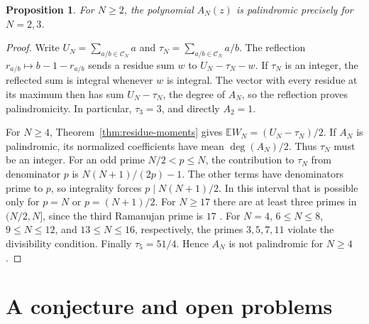 \documentclass[11pt]{amsart}
\newtheorem{proposition}[theorem]{Proposition}
\theoremstyle{remark}
\newcommand{\Ee}{\mathbb E}
\newcommand{\CN}{\mathcal C_N}
\begin{document}
\begin{proposition}
\label{prop:residue-palindromic}
For \(N\ge2\), the polynomial \(A_N(z)\) is palindromic precisely for \(N=2,3\).
\end{proposition}

\begin{proof}
Write \(U_N=\sum_{a/b\in\CN} a\) and \(\tau_N=\sum_{a/b\in\CN}a/b\).
The reflection \(r_{a/b}\mapsto b-1-r_{a/b}\) sends a residue sum \(w\)
to \(U_N-\tau_N-w\). If \(\tau_N\) is an integer, the reflected sum is
integral whenever \(w\) is integral. The vector with every residue at
its maximum then has sum \(U_N-\tau_N\), the degree of \(A_N\), so the
reflection proves palindromicity. In particular, \(\tau_3=3\), and
directly \(A_2=1\).

For \(N\ge4\), Theorem~\ref{thm:residue-moments} gives
\(\Ee W_N=(U_N-\tau_N)/2\). If \(A_N\) is palindromic, its normalized
coefficients have mean \(\deg(A_N)/2\). Thus \(\tau_N\) must be an
integer. For an odd prime \(N/2<p\le N\), the contribution to \(\tau_N\)
from denominator \(p\) is \(N(N+1)/(2p)-1\). The other terms have
denominators prime to \(p\), so integrality forces \(p\mid N(N+1)/2\).
In this interval that is possible only for \(p=N\) or \(p=(N+1)/2\).
For \(N\ge17\) there are at least three primes in \((N/2,N]\), since
the third Ramanujan prime is \(17\) \cite{sondow}. For \(N=4\),
\(6\le N\le8\), \(9\le N\le12\), and \(13\le N\le16\), respectively,
the primes \(3,5,7,11\) violate the divisibility condition. Finally
\(\tau_5=51/4\). Hence \(A_N\) is not palindromic for \(N\ge4\).
\end{proof}

\section{A conjecture and open problems}\label{sec:conjecture}
\end{document}
